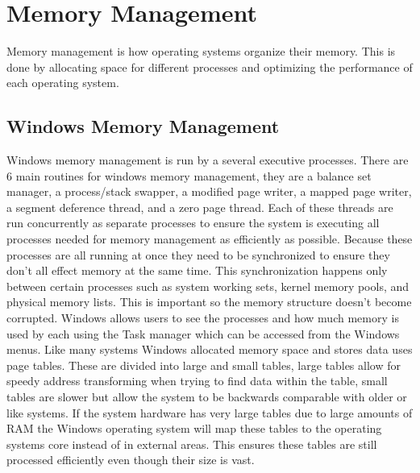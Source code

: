 \documentclass[onecolumn, draftclsnofoot,10pt, compsoc]{IEEEtran}
\begin{document}
\section{Memory Management}
Memory management is how operating systems organize their memory. This is done by allocating space for different processes and optimizing the performance of each operating system\cite{9}.
\subsection{Windows Memory Management}
Windows memory management is run by a several executive processes. There are 6 main routines for windows memory management, they are a balance set manager, a process/stack swapper, a modified page writer, a mapped page writer, a segment deference thread, and a zero page thread\cite{3}. Each of these threads are run concurrently as separate processes to ensure the system is executing all processes needed for memory management as efficiently as possible. Because these processes are all running at once they need to be synchronized to ensure they don't all effect memory at the same time. This synchronization happens only between certain processes such as system working sets, kernel memory pools, and physical memory lists. This is important so the memory structure doesn't become corrupted. Windows allows users to see the processes and how much memory is used by each using the Task manager which can be accessed from the Windows menus.
Like many systems Windows allocated memory space and stores data uses page tables. These are divided into large and small tables, large tables allow for speedy address transforming when trying to find data within the table, small tables are slower but allow the system to be backwards comparable with older or like systems. If the system hardware has very large tables due to large amounts of RAM the Windows operating system will map these tables to the operating systems core instead of in external areas. This ensures these tables are still processed efficiently even though their size is vast.   
\end{document}

